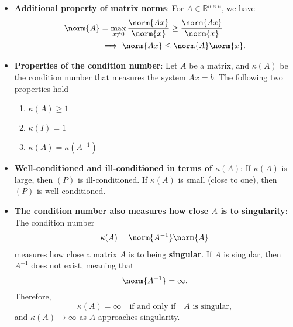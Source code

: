 \documentclass{report}
\begin{document}
\begin{itemize}
\begin{enumerate}
            \end{enumerate}
        \item \textbf{Additional property of matrix norms}: For $A \in \mathbb{R}^{n\times n}$, we have
            \begin{align*}
                \norm{A} &= \max_{x\ne 0} \frac{\norm{Ax}}{\norm{x}} \geq \frac{\norm{Ax}}{\norm{x}} \\
                         &\implies \norm{Ax} \leq \norm{A}\norm{x}
            .\end{align*}
        \item \textbf{Properties of the condition number}: Let $A$ be a matrix, and $\kappa(A)$ be the condition number that measures the system $Ax = b$. The following two properties hold
            \begin{enumerate}
                \item $\kappa(A) \geq 1$
                \item $\kappa(I) = 1$
                \item $\kappa(A) = \kappa(A^{-1}) $
            \end{enumerate}
        \item \textbf{Well-conditioned and ill-conditioned in terms of $\kappa(A)$}: If $\kappa(A)$ is large, then $(P)$ is ill-conditioned. If $\kappa(A)$ is small (close to one), then $(P)$ is well-conditioned.
        \item \textbf{The condition number also measures how close $A$ is to singularity}: The condition number
            \begin{align*}
                \kappa(A) = \norm{A^{-1}}\norm{A}
            \end{align*}
            measures how close a matrix $A $ is to being \textbf{singular}. If $A$ is singular, then $A^{-1}$ does not exist, meaning that
            \[
                \norm{A^{-1}} = \infty.
            \]
            Therefore,
            \[
                \kappa(A) = \infty 
                \quad \text{if and only if} \quad 
                A \text{ is singular},
            \]
            and $\kappa(A) \to \infty$ as $A$ approaches singularity.



    \end{itemize}

    \pagebreak 
\end{document}
